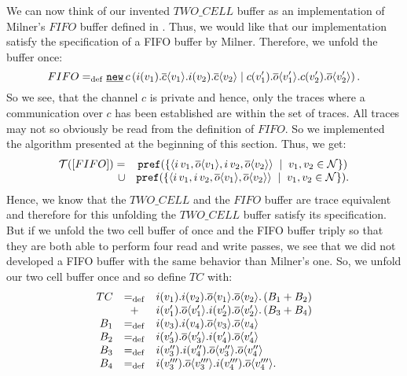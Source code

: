 We can now think of our invented $TWO\_CELL$ buffer as an implementation of Milner's $FIFO$ buffer defined in . Thus, we would like that our implementation satisfy the specification of a FIFO buffer by Milner. Therefore, we unfold the buffer once:
\[FIFO\define\procres[()]{c}{\procpar{\inp{i}{v_1}.\out{c}{v_1}.\inp{i}{v_2}.\out{c}{v_2}}{\inp{c}{v_1'}.\out{o}{v_1'}.\inp{c}{v_2'}.\out{o}{v_2'}}}.\]
So we see, that the channel $c$ is private and hence, only the traces where a communication over $c$ has been established are within the set of traces. All traces may not so obviously be read from the definition of $FIFO$. So we implemented the algorithm presented at the beginning of this section. Thus, we get:
\begin{align*}
\begin{array}{rcl}
 \traces[FIFO]=&\pref{\set[v_1,v_2\in\names]{\seq{\inpa{i}{v_1},\outa{o}{v_1},\inpa{i}{v_2},\out{o}{v_2}}}} \\
\cup&\pref{\set[v_1,v_2\in\names]{\seq{\inpa{i}{v_1},\inpa{i}{v_2},\outa{o}{v_1},\outa{o}{v_2}}}}.
\end{array}
\end{align*}
Hence, we know that the $TWO\_CELL$ and the $FIFO$ buffer are trace equivalent and therefore for this unfolding the $TWO\_CELL$ buffer satisfy its specification. But if we unfold the two cell buffer of  once and the FIFO buffer triply so that they are both able to perform four read and write passes, we see that we did not developed a FIFO buffer with the same behavior than Milner's one. So, we unfold our two cell buffer once and so define $TC$ with:
\begin{align*}
	\begin{array}{rcl}
TC&=_{\mathrm{def}}& i(v_1).i(v_2).\overline{o}\langle v_1\rangle.\overline{o}\langle v_2\rangle.\left(B_1 + B_2\right) \\
			&+& i(v_1').\overline{o}\langle v_1'\rangle.i(v_2').\overline{o}\langle v_2'\rangle.\left(B_3 + B_4\right) \\
B_1&=_{\mathrm{def}}&i(v_3).i(v_4).\overline{o}\langle v_3\rangle.\overline{o}\langle v_4\rangle \\
B_2&=_{\mathrm{def}}&i(v_3').\overline{o}\langle v_3'\rangle.i(v_4').\overline{o}\langle v_4'\rangle \\
B_3&=_{\mathrm{def}}&i(v_3'').i(v_4'').\overline{o}\langle v_3''\rangle.\overline{o}\langle v_4''\rangle \\
B_4&=_{\mathrm{def}}&i(v_3''').\overline{o}\langle v_3'''\rangle.i(v_4''').\overline{o}\langle v_4'''\rangle.
\end{array}
\end{align*}
